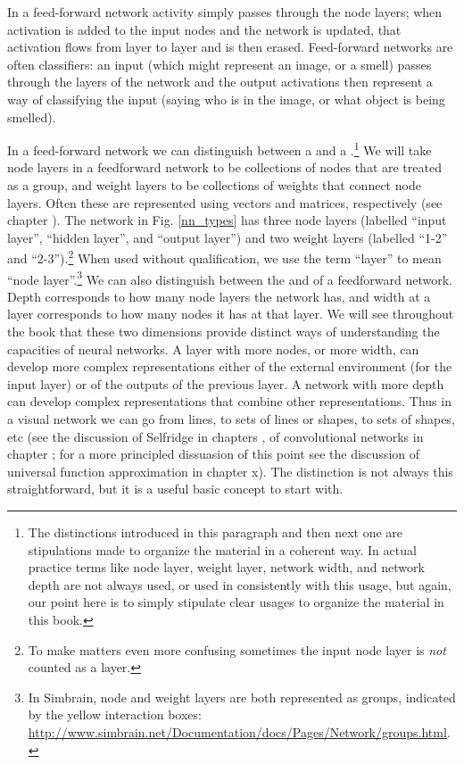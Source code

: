  In a feed-forward network activity simply passes through the node layers; when activation is added to the input nodes and the network is updated, that activation flows from layer to layer and is then erased. Feed-forward networks are often classifiers: an input (which might represent an image, or a smell) passes through the layers of the network and the output activations then represent a way of classifying the input (saying who is in the image, or what object is being smelled).

In a feed-forward network we can distinguish between a  and a .\footnote{The distinctions introduced in this paragraph and then next one are stipulations made to organize the material in a coherent way. In actual practice terms like node layer, weight layer, network width, and network depth are not always used, or used in consistently with this usage, but again, our point here is to simply stipulate clear usages to organize the material in this book.}  We will take node layers in a feedforward network to be collections of nodes that are treated as a group, and weight layers to be collections of weights that connect node layers. Often these are represented using vectors and matrices, respectively (see chapter ). The network in Fig. \ref{nn_types} has three node layers (labelled ``input layer'', ``hidden layer'', and ``output layer'') and two weight layers (labelled ``1-2'' and ``2-3'').\footnote{To make matters even more confusing sometimes the input node layer is \emph{not} counted as a layer.} When used without qualification, we use the term ``layer'' to mean ``node layer''.\footnote{In Simbrain, node and weight layers are both represented as groups, indicated by the yellow interaction boxes: \url{http://www.simbrain.net/Documentation/docs/Pages/Network/groups.html}.}
We can also distinguish between the  and  of a feedforward network.  Depth corresponds to how many node layers the network has, and width at a layer corresponds to how many nodes it has at that layer. We will see throughout the book that these two dimensions provide distinct ways of understanding the capacities of neural networks. A layer with more nodes, or more width, can develop more complex representations either of the external environment (for the input layer) or of the outputs of the previous layer. A network with more depth can develop complex representations that combine other representations. Thus in a  visual network we can go from lines, to sets of lines or shapes, to sets of shapes, etc (see the discussion of Selfridge in chapters , of convolutional networks in chapter ; for a more principled dissuasion of this point see the discussion of universal function approximation in chapter x). The distinction is not always this straightforward, but it is a useful basic concept to start with.

